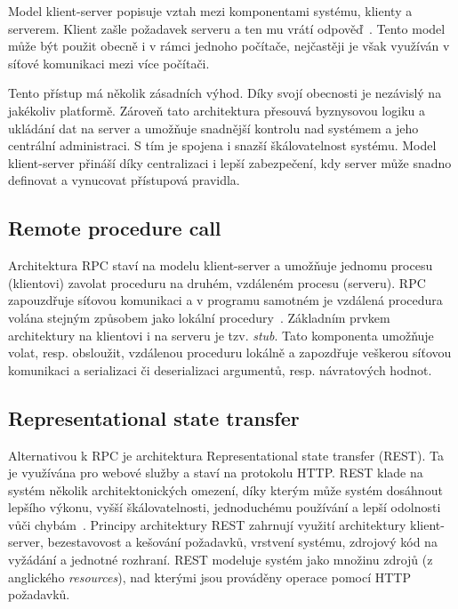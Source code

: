 Model klient-server popisuje vztah mezi komponentami systému, klienty a serverem.
Klient zašle požadavek serveru a ten mu vrátí odpověď~\cite{berson1992client}.
Tento model může být použit obecně i v rámci jednoho počítače,
nejčastěji je však využíván v síťové komunikaci mezi více počítači.

Tento přístup má několik zásadních výhod. Díky svojí obecnosti je nezávislý
na jakékoliv platformě. Zároveň tato architektura přesouvá byznysovou logiku a
ukládání dat na server a umožňuje snadnější kontrolu nad systémem a jeho centrální
administraci. S tím je spojena i snazší škálovatelnost systému. Model klient-server
přináší díky centralizaci i lepší zabezpečení, kdy server může snadno definovat a
vynucovat přístupová pravidla.

\subsection{Remote procedure call}\label{sec:rpc}

Architektura \gls{RPC} staví na modelu klient-server a umožňuje jednomu procesu (klientovi)
zavolat proceduru na druhém, vzdáleném procesu (serveru).
\gls{RPC} zapouzdřuje síťovou komunikaci a v programu samotném
je vzdálená procedura volána stejným způsobem jako lokální procedury~\cite{nelson1981remote}. Základním
prvkem architektury na klientovi i na serveru je tzv. \textit{stub}. Tato komponenta
umožňuje volat, resp. obsloužit, vzdálenou proceduru lokálně a zapozdřuje veškerou
síťovou komunikaci a serializaci či deserializaci argumentů, resp. návratových hodnot.

\subsection{Representational state transfer}\label{sec:rest}

Alternativou k \gls{RPC} je architektura Representational state transfer
(\gls{REST}). Ta je využívána pro webové služby a staví na protokolu \gls{HTTP}.
\gls{REST} klade na systém několik architektonických omezení, díky kterým může systém dosáhnout
lepšího výkonu, vyšší škálovatelnosti, jednoduchému používání
a lepší odolnosti vůči chybám~\cite{fielding2000rest}. Principy architektury
\gls{REST} zahrnují využití architektury klient-server, bezestavovost a kešování požadavků,
vrstvení systému, zdrojový kód na vyžádání a jednotné rozhraní.
\gls{REST} modeluje systém jako množinu zdrojů (z anglického \textit{resources}),
nad kterými jsou prováděny operace pomocí \gls{HTTP} požadavků.

